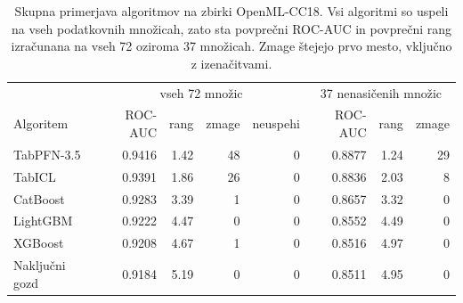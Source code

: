 \begin{table}[H]
\centering
\caption{Skupna primerjava algoritmov na zbirki OpenML-CC18. Vsi algoritmi so uspeli na vseh podatkovnih množicah, zato sta povprečni ROC-AUC in povprečni rang izračunana na vseh 72 oziroma 37 množicah. Zmage štejejo prvo mesto, vključno z izenačitvami.}
\label{tab:skupno}
\footnotesize
\setlength{\tabcolsep}{4pt}
\begin{tabular}{lrrrrrrr}
\hline
 & \multicolumn{4}{c}{vseh 72 množic} & \multicolumn{3}{c}{37 nenasičenih množic} \\
Algoritem & ROC-AUC & rang & zmage & neuspehi & ROC-AUC & rang & zmage \\
\hline
TabPFN-3.5 & \num{0.9416} & \num{1.42} & 48 & 0 & \num{0.8877} & \num{1.24} & 29 \\
TabICL & \num{0.9391} & \num{1.86} & 26 & 0 & \num{0.8836} & \num{2.03} & 8 \\
CatBoost & \num{0.9283} & \num{3.39} & 1 & 0 & \num{0.8657} & \num{3.32} & 0 \\
LightGBM & \num{0.9222} & \num{4.47} & 0 & 0 & \num{0.8552} & \num{4.49} & 0 \\
XGBoost & \num{0.9208} & \num{4.67} & 1 & 0 & \num{0.8516} & \num{4.97} & 0 \\
Naključni gozd & \num{0.9184} & \num{5.19} & 0 & 0 & \num{0.8511} & \num{4.95} & 0 \\
\hline
\end{tabular}
\end{table}
